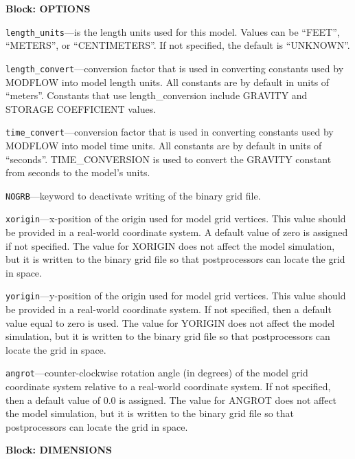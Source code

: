 
\item \textbf{Block: OPTIONS}

\begin{description}
\item \texttt{length\_units}---is the length units used for this model.  Values can be ``FEET'', ``METERS'', or ``CENTIMETERS''.  If not specified, the default is ``UNKNOWN''.

\item \texttt{length\_convert}---conversion factor that is used in converting constants used by MODFLOW into model length units.  All constants are by default in units of ``meters''. Constants that use length\_conversion include GRAVITY and STORAGE COEFFICIENT values.

\item \texttt{time\_convert}---conversion factor that is used in converting constants used by MODFLOW into model time units.  All constants are by default in units of ``seconds''. TIME\_CONVERSION is used to convert the GRAVITY constant from seconds to the model's units.

\item \texttt{NOGRB}---keyword to deactivate writing of the binary grid file.

\item \texttt{xorigin}---x-position of the origin used for model grid vertices.  This value should be provided in a real-world coordinate system.  A default value of zero is assigned if not specified.  The value for XORIGIN does not affect the model simulation, but it is written to the binary grid file so that postprocessors can locate the grid in space.

\item \texttt{yorigin}---y-position of the origin used for model grid vertices.  This value should be provided in a real-world coordinate system.  If not specified, then a default value equal to zero is used.  The value for YORIGIN does not affect the model simulation, but it is written to the binary grid file so that postprocessors can locate the grid in space.

\item \texttt{angrot}---counter-clockwise rotation angle (in degrees) of the model grid coordinate system relative to a real-world coordinate system.  If not specified, then a default value of 0.0 is assigned.  The value for ANGROT does not affect the model simulation, but it is written to the binary grid file so that postprocessors can locate the grid in space.

\end{description}
\item \textbf{Block: DIMENSIONS}

